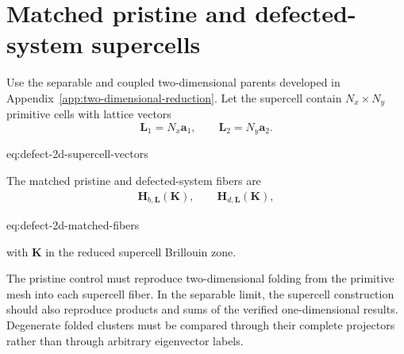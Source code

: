 \section{Matched pristine and defected-system supercells}

Use the separable and coupled two-dimensional parents developed in
Appendix~\ref{app:two-dimensional-reduction}. Let
the supercell contain $N_x\times N_y$ primitive cells with lattice vectors
\begin{equation}
    \mathbf L_1=N_x\mathbf a_1,
    \qquad
    \mathbf L_2=N_y\mathbf a_2.
    \label{eq:defect-2d-supercell-vectors}
\end{equation}
\begin{equationterms}{eq:defect-2d-supercell-vectors}
\end{equationterms}
The matched pristine and defected-system fibers are
\begin{align}
    \mathbf H_{b,\mathbf L}(\mathbf K),
    \qquad
    \mathbf H_{d,\mathbf L}(\mathbf K),
    \label{eq:defect-2d-matched-fibers}
\end{align}
\begin{equationterms}{eq:defect-2d-matched-fibers}
\end{equationterms}
with $\mathbf K$ in the reduced supercell Brillouin zone.

The pristine control must reproduce two-dimensional folding from the primitive
mesh into each supercell fiber. In the separable limit, the supercell
construction should also reproduce products and sums of the verified
one-dimensional results. Degenerate folded clusters must be compared through
their complete projectors rather than through arbitrary eigenvector labels.


